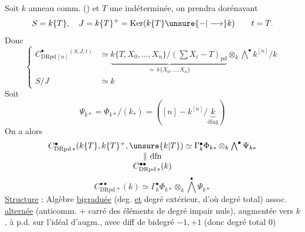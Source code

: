 Soit $k$ anneau comm. () et $T$ une indéterminée, on prendra dorénavant
\[
S=k\{T\},\quad J=k\{T\}^+=\operatorname{Ker}(k\{T\}\unsure{-|\longrightarrow}k)
\qquad t=T.
\]
Donc
\[
\left\{\begin{aligned}
C^\bullet_{\mathrm{DRpd}\,[n]}{}^{(S,J,t)}&\simeq
\underbrace{k\{T,X_0,\ldots,X_n\}/(\textstyle\sum X_i-T)_{\mathrm{pd}}}_{\displaystyle\simeq\ k\{X_0,\ldots,X_n\}}
\otimes_k\bigwedge^\bullet k^{[n]}/k\\
S/J&\simeq k
\end{aligned}\right.
\]
Soit
\[
\Psi_{k*}=\Phi_{k*}/(k_*)=([n]\mathbin{-}k^{[n]}/\underbrace{k}_{\mathrm{diag}})
\]
On a alors
\[
\begin{array}{c}
C^\bullet_{\mathrm{DRpd}\,*}(k\{T\},k\{T\}^+,\unsure{k|T})\simeq\Gamma^\bullet_k\Phi_{k*}\otimes_k\bigwedge^\bullet\Psi_{k*}\\
\Vert\ \mathrm{dfn}\\
C^{\bullet\bullet}_{\mathrm{DRpd}\,*}(k)
\end{array}
\]
\[
\boxed{C^{\bullet\bullet}_{\mathrm{DRpd}\,*}(k)\simeq\Gamma^\bullet_k\Phi_{k*}\otimes_k\bigwedge^\bullet\Psi_{k*}}
\]
\uline{Structure} : Algèbre  \uline{bigraduée} (deg.  \uline{et} degré extérieur, d'où degré total)  assoc.  \uline{alternée} (anticomm. $+$ carré des éléments de degré impair nuls), augmentée vers $k$, à p.d. sur l'idéal d'augm., avec diff de bidegré $-1,+1$ (donc degré total 0) 
